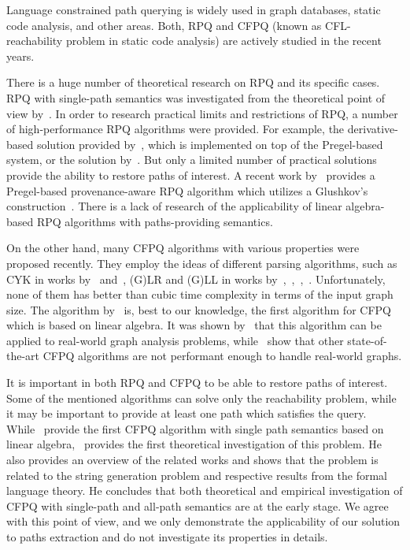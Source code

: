 
Language constrained path querying is widely used in graph databases, static code analysis, and other areas.
Both, RPQ and CFPQ (known as CFL-reachability problem in static code analysis) are actively studied in the recent years.

There is a huge number of theoretical research on RPQ and its specific cases.
RPQ with single-path semantics was investigated from the theoretical point of view by~\cite{barrett2000formal}.
In order to research practical limits and restrictions of RPQ, a number of high-performance RPQ algorithms were provided.
For example, the derivative-based solution provided by~\cite{10.1145/2949689.2949711}, which is implemented on top of the Pregel-based system, or the solution by~\cite{10.1007/978-3-642-31235-9_12}.
But only a limited number of practical solutions provide the ability to restore paths of interest.
A recent work by~\cite{Wang2019} provides a Pregel-based provenance-aware RPQ algorithm which utilizes a Glushkov's construction~\cite{Glushkov1961}.
There is a lack of research of the applicability of linear algebra-based RPQ algorithms with paths-providing semantics.

On the other hand, many CFPQ algorithms with various properties were proposed recently.
They employ the ideas of different parsing algorithms, such as CYK in works by~\cite{hellingsRelational} and~\cite{8249039}, (G)LR and (G)LL in works by~\cite{Grigorev:2017:CPQ:3166094.3166104},~\cite{Medeiros:2018:EEC:3167132.3167265},~\cite{10.1007/978-3-319-91662-0_17},~\cite{10.1007/978-3-319-41579-6_22}.
Unfortunately, none of them has better than cubic time complexity in terms of the input graph size.
The algorithm by~\cite{Azimov:2018:CPQ:3210259.3210264} is, best to our knowledge, the first algorithm for CFPQ which is based on linear algebra.
It was shown by~\cite{10.1145/3398682.3399163} that this algorithm can be applied to real-world graph analysis problems, while~\cite{Kuijpers:2019:ESC:3335783.3335791} show that other state-of-the-art CFPQ algorithms are not performant enough to handle real-world graphs.

It is important in both RPQ and CFPQ to be able to restore paths of interest.
Some of the mentioned algorithms can solve only the reachability problem, while it may be important to provide at least one path which satisfies the query.
While~\cite{10.1145/3398682.3399163} provide the first CFPQ algorithm with single path semantics based on linear algebra,~\cite{HellSinglePath} provides the first theoretical investigation of this problem.
He also provides an overview of the related works and shows that the problem is related to the string generation problem and respective results from the formal language theory.
He concludes that both theoretical and empirical investigation of CFPQ with single-path and all-path semantics are at the early stage.
We agree with this point of view, and we only demonstrate the applicability of our solution to paths extraction and do not investigate its properties in details.

